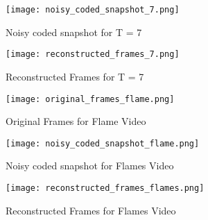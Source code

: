 \documentclass[a4paper,12pt]{article}
\begin{document}
\begin{figure}[htbp]
    \centering
    \texttt{[image: noisy\_coded\_snapshot\_7.png]}
    \caption{Noisy coded snapshot for T = 7}
\end{figure}

\begin{figure}[htbp]
    \centering
    \texttt{[image: reconstructed\_frames\_7.png]}
    \caption{Reconstructed Frames for T = 7}
\end{figure}


\begin{figure}[htbp]
    \centering
    \texttt{[image: original\_frames\_flame.png]}
    \caption{Original Frames for Flame Video}
\end{figure}

\begin{figure}[htbp]
    \centering
    \texttt{[image: noisy\_coded\_snapshot\_flame.png]}
    \caption{Noisy coded snapshot for Flames Video}
\end{figure}

\begin{figure}[htbp]
    \centering
    \texttt{[image: reconstructed\_frames\_flames.png]}
    \caption{Reconstructed Frames for Flames Video}
\end{figure}
\end{document}
